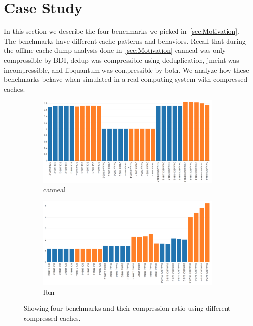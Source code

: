 \section{Case Study}
\label{sec:case_study}
In this section we describe the four benchmarks we picked in~\ref{sec:Motivation}. The benchmarks have different cache patterns and behaviors. Recall that during the offline cache dump analysis done in~\ref{sec:Motivation} canneal was only compressible by BDI, dedup was compressible using deduplication, jmeint was incompressible, and libquantum was compressible by both. We analyze how these benchmarks behave when simulated in a real computing system with compressed caches.\par
\begin{figure}
    \begin{subfigure}{\textwidth}
        \includegraphics[width=\textwidth]{canneal-compratio.png}
        \caption{canneal}
    \end{subfigure}
    \begin{subfigure}{\textwidth}
        \includegraphics[width=\textwidth]{lbm-compratio.png}
        \caption{lbm}
    \end{subfigure}
    \caption[Case Study: Compression1]{Showing four benchmarks and their compression ratio using different compressed caches.}
    \label{fig:case_compratio1}
\end{figure}
